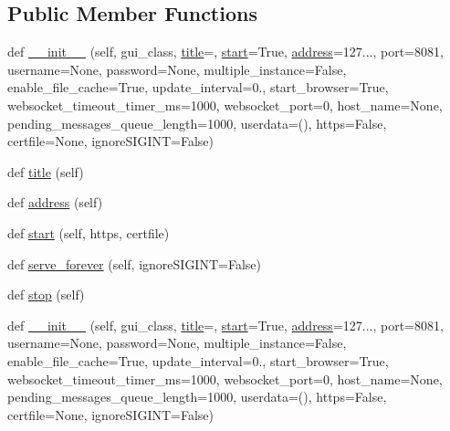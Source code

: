 \subsection*{Public Member Functions}
\begin{DoxyCompactItemize}
\item 
def \hyperlink{classremi_1_1server_1_1Server_afb39e663653835160a7fe12bdc298bca}{\+\_\+\+\_\+init\+\_\+\+\_\+} (self, gui\+\_\+class, \hyperlink{classremi_1_1server_1_1Server_a2e53f38dc0ced2c472d662d7dce195da}{title}=\textquotesingle{}\textquotesingle{}, \hyperlink{classremi_1_1server_1_1Server_a442c9f9b26e9c9bd5049461a25a21430}{start}=True, \hyperlink{classremi_1_1server_1_1Server_a10d27f58025a2343347abc999b523773}{address}=\textquotesingle{}127...\textquotesingle{}, port=8081, username=None, password=None, multiple\+\_\+instance=False, enable\+\_\+file\+\_\+cache=True, update\+\_\+interval=0., start\+\_\+browser=True, websocket\+\_\+timeout\+\_\+timer\+\_\+ms=1000, websocket\+\_\+port=0, host\+\_\+name=None, pending\+\_\+messages\+\_\+queue\+\_\+length=1000, userdata=(), https=False, certfile=None, ignore\+S\+I\+G\+I\+NT=False)
\item 
def \hyperlink{classremi_1_1server_1_1Server_a2e53f38dc0ced2c472d662d7dce195da}{title} (self)
\item 
def \hyperlink{classremi_1_1server_1_1Server_a10d27f58025a2343347abc999b523773}{address} (self)
\item 
def \hyperlink{classremi_1_1server_1_1Server_a442c9f9b26e9c9bd5049461a25a21430}{start} (self, https, certfile)
\item 
def \hyperlink{classremi_1_1server_1_1Server_a4ac0544b43e4fd854c931a86656ce2de}{serve\+\_\+forever} (self, ignore\+S\+I\+G\+I\+NT=False)
\item 
def \hyperlink{classremi_1_1server_1_1Server_a9650d8044020da20f309c5922e15a292}{stop} (self)
\item 
def \hyperlink{classremi_1_1server_1_1Server_afb39e663653835160a7fe12bdc298bca}{\+\_\+\+\_\+init\+\_\+\+\_\+} (self, gui\+\_\+class, \hyperlink{classremi_1_1server_1_1Server_a2e53f38dc0ced2c472d662d7dce195da}{title}=\textquotesingle{}\textquotesingle{}, \hyperlink{classremi_1_1server_1_1Server_a442c9f9b26e9c9bd5049461a25a21430}{start}=True, \hyperlink{classremi_1_1server_1_1Server_a10d27f58025a2343347abc999b523773}{address}=\textquotesingle{}127...\textquotesingle{}, port=8081, username=None, password=None, multiple\+\_\+instance=False, enable\+\_\+file\+\_\+cache=True, update\+\_\+interval=0., start\+\_\+browser=True, websocket\+\_\+timeout\+\_\+timer\+\_\+ms=1000, websocket\+\_\+port=0, host\+\_\+name=None, pending\+\_\+messages\+\_\+queue\+\_\+length=1000, userdata=(), https=False, certfile=None, ignore\+S\+I\+G\+I\+NT=False)

\end{DoxyCompactItemize}
